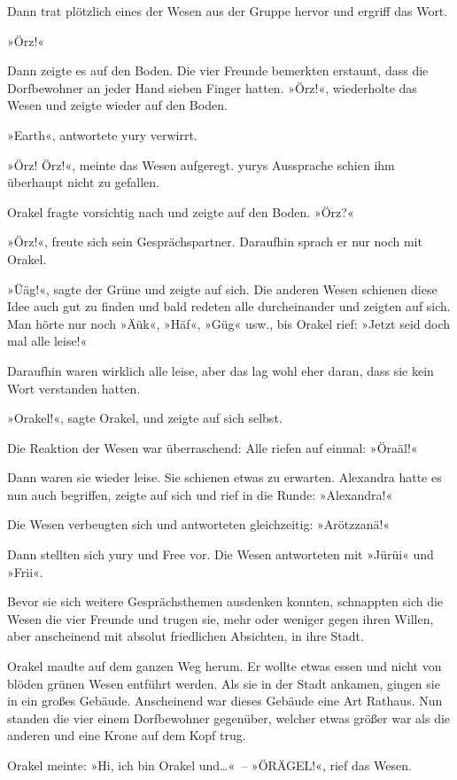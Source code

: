 Dann trat plötzlich eines der Wesen aus der Gruppe hervor und ergriff das Wort.

»Örz!«

Dann zeigte es auf den Boden. Die vier Freunde bemerkten erstaunt, dass die Dorfbewohner an jeder Hand sieben Finger hatten. »Örz!«, wiederholte das Wesen und zeigte wieder auf den Boden.

»Earth«, antwortete yury verwirrt.

»Örz! Örz!«, meinte das Wesen aufgeregt. yurys Aussprache schien ihm überhaupt nicht zu gefallen.

Orakel fragte vorsichtig nach und zeigte auf den Boden. »Örz?«

»Örz!«, freute sich sein Gesprächspartner. Daraufhin sprach er nur noch mit Orakel.

»Üäg!«, sagte der Grüne und zeigte auf sich. Die anderen Wesen schienen diese Idee auch gut zu finden und bald redeten alle durcheinander und zeigten auf sich. Man hörte nur noch »Äük«, »Häf«, »Güg« usw., bis Orakel rief: »Jetzt seid doch mal alle leise!«

Daraufhin waren wirklich alle leise, aber das lag wohl eher daran, dass sie kein Wort verstanden hatten.

»Orakel!«, sagte Orakel, und zeigte auf sich selbst.

Die Reaktion der Wesen war überraschend: Alle riefen auf einmal: »Öraäl!«

Dann waren sie wieder leise. Sie schienen etwas zu erwarten. Alexandra hatte es nun auch begriffen, zeigte auf sich und rief in die Runde: »Alexandra!«

Die Wesen verbeugten sich und antworteten gleichzeitig: »Arötzzanä!«

Dann stellten sich yury und Free vor. Die Wesen antworteten mit »Jürüi« und »Frii«.

Bevor sie sich weitere Gesprächsthemen ausdenken konnten, schnappten sich die Wesen die vier Freunde und trugen sie, mehr oder weniger gegen ihren Willen, aber anscheinend mit absolut friedlichen Absichten, in ihre Stadt.

Orakel maulte auf dem ganzen Weg herum. Er wollte etwas essen und nicht von blöden grünen Wesen entführt werden. Als sie in der Stadt ankamen, gingen sie in ein großes Gebäude. Anscheinend war dieses Gebäude eine Art Rathaus. Nun standen die vier einem Dorfbewohner gegenüber, welcher etwas größer war als die anderen und eine Krone auf dem Kopf trug.

Orakel meinte: »Hi, ich bin Orakel und…«~– »ÖRÄGEL!«, rief das Wesen.

